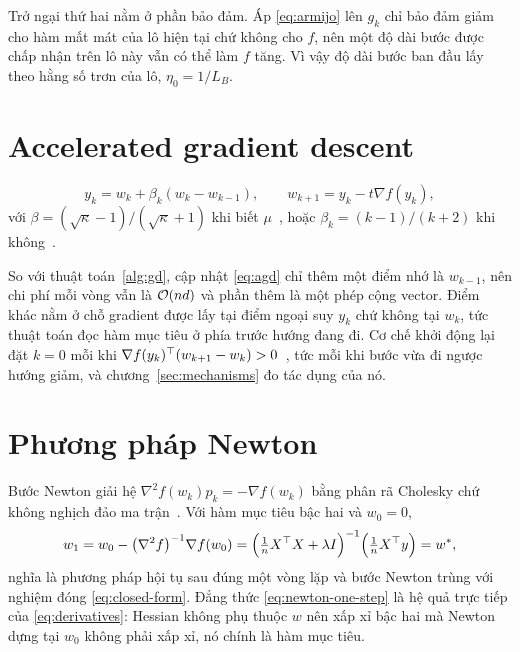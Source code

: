 Trở ngại thứ hai nằm ở phần bảo đảm. Áp \eqref{eq:armijo} lên $g_k$ chỉ bảo đảm
giảm cho hàm mất mát của lô hiện tại chứ không cho $f$, nên một độ dài bước được
chấp nhận trên lô này vẫn có thể làm $f$ tăng. Vì vậy độ dài bước ban đầu lấy
theo hằng số trơn của lô, $\eta_0 = 1/L_B$.

\section{Accelerated gradient descent}
\label{sec:impl-agd}

\begin{equation}
  \label{eq:agd}
  y_k = w_k + \beta_k (w_k - w_{k-1}), \qquad
  w_{k+1} = y_k - t \nabla f(y_k) ,
\end{equation}
%
với $\beta = (\sqrt{\kappa} - 1)/(\sqrt{\kappa} + 1)$ khi biết
$\mu$~\cite{nesterov2018lectures}, hoặc $\beta_k = (k-1)/(k+2)$ khi
không~\cite{beck2009fista}.

So với thuật toán~\ref{alg:gd}, cập nhật \eqref{eq:agd} chỉ thêm một điểm nhớ là
$w_{k-1}$, nên chi phí mỗi vòng vẫn là $\mathcal{O}(nd)$ và phần thêm là một phép
cộng vector. Điểm khác nằm ở chỗ gradient được lấy tại điểm ngoại suy $y_k$ chứ
không tại $w_k$, tức thuật toán đọc hàm mục tiêu ở phía trước hướng đang đi. Cơ
chế khởi động lại đặt $k = 0$ mỗi khi $\nabla f(y_k)^{\top} (w_{k+1} - w_k) >
0$~\cite{odonoghue2015restart}, tức mỗi khi bước vừa đi ngược hướng giảm, và
chương~\ref{sec:mechanisms} đo tác dụng của nó.

\section{Phương pháp Newton}
\label{sec:impl-newton}

Bước Newton giải hệ $\nabla^{2} f(w_k) p_k = -\nabla f(w_k)$ bằng phân rã
Cholesky chứ không nghịch đảo ma trận~\cite{boyd2004convex}. Với hàm mục tiêu bậc
hai và $w_0 = 0$,
%
\begin{equation}
  \label{eq:newton-one-step}
  w_1 = w_0 - \bigl( \nabla^{2} f \bigr)^{-1} \nabla f(w_0)
      = \Bigl( \tfrac{1}{n} X^{\top} X + \lambda I \Bigr)^{-1}
        \Bigl( \tfrac{1}{n} X^{\top} y \Bigr) = w^{*} ,
\end{equation}
%
nghĩa là phương pháp hội tụ sau đúng một vòng lặp và bước Newton trùng với nghiệm
đóng \eqref{eq:closed-form}. Đẳng thức \eqref{eq:newton-one-step} là hệ quả trực
tiếp của
\eqref{eq:derivatives}: Hessian không phụ thuộc $w$ nên xấp xỉ bậc hai mà Newton
dựng tại $w_0$ không phải xấp xỉ, nó chính là hàm mục tiêu.

